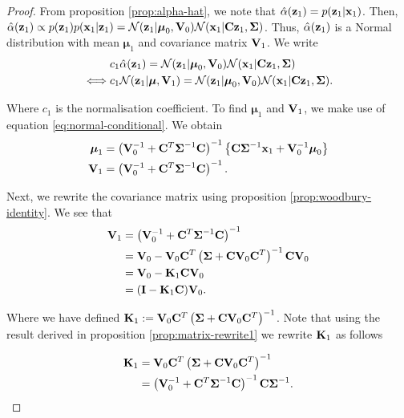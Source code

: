 \documentclass[11pt]{article}
\numberwithin{equation}{section}
\newcommand{\x}{{\bf x}}
\newcommand{\z}{{\bf z}}
\newcommand{\N}{\mathcal{N}}
\begin{document}
\begin{proof}
	From proposition \ref{prop:alpha-hat}, we note that $\hat\alpha(\z_1) = p(\z_1\vert\x_1)$. Then, $\hat\alpha(\z_1) \propto p(\z_1)p(\x_1\vert\z_1) = \N(\z_1 \vert \boldsymbol\mu_0, {\bf V}_0) \N(\x_1\vert {\bf C}\z_1, \boldsymbol\Sigma)$. Thus, $\hat\alpha(\z_1)$ is a Normal distribution with mean $\boldsymbol{\mu}_1$ and covariance matrix ${\bf V}_1$. We write
	\begin{align}
		&c_1 \hat\alpha(\z_1) = \N(\z_1 \vert \boldsymbol\mu_0, {\bf V}_0) \N(\x_1\vert {\bf C}\z_1, \boldsymbol\Sigma)\\
		\iff& c_1 \N(\z_1\vert \boldsymbol\mu, {\bf V}_1) = \N(\z_1 \vert \boldsymbol\mu_0, {\bf V}_0) \N(\x_1\vert {\bf C}\z_1, \boldsymbol\Sigma).
	\end{align}
	
	Where $c_1$ is the normalisation coefficient. To find $\boldsymbol{\mu}_1$ and ${\bf V}_1$, we make use of equation \eqref{eq:normal-conditional}. We  obtain
	\begin{align}
		\boldsymbol{\mu}_1 &= \left({\bf V}_0^{-1} + {\bf C}^T\boldsymbol{\Sigma}^{-1} {\bf C}\right)^{-1} \left\{{\bf C}\boldsymbol\Sigma^{-1}\x_1 + {\bf V}_0^{-1}\boldsymbol\mu_0\right\}\\
		{\bf V}_1 &= \left({\bf V}_0^{-1} + {\bf C}^T\boldsymbol{\Sigma}^{-1} {\bf C}\right)^{-1}.
	\end{align}
	
	Next, we rewrite the covariance matrix using proposition \ref{prop:woodbury-identity}. We see that 
	\begin{align}
		{\bf V}_1 &= \left({\bf V}_0^{-1} + {\bf C}^T\boldsymbol{\Sigma}^{-1} {\bf C}\right)^{-1}\\
		&= {\bf V}_0 - {\bf V}_0 {\bf C}^T\left(\boldsymbol\Sigma + {\bf C}{\bf V}_0{\bf C}^T\right)^{-1}{\bf C}{\bf V}_0 \\
		&= {\bf V}_0 - {\bf K}_1{\bf C}{\bf V}_0\\
		&= ({\bf I} - {\bf K}_1{\bf C}){\bf V}_0. \label{eq:part-v1-rewrite}
	\end{align}
	
	Where we have defined ${\bf K}_1 := {\bf V}_0 {\bf C}^T\left(\boldsymbol\Sigma + {\bf C}{\bf V}_0{\bf C}^T\right)^{-1}$. Note that using the result derived in proposition \ref{prop:matrix-rewrite1} we rewrite ${\bf K}_1$ as follows
	
	\begin{align}
		{\bf K}_1 &= {\bf V}_0 {\bf C}^T\left(\boldsymbol\Sigma + {\bf C}{\bf V}_0{\bf C}^T\right)^{-1}\\
				  &= \left({\bf V}_0^{-1} + {\bf C}^T \boldsymbol\Sigma^{-1}{\bf C}\right)^{-1}{\bf C}\boldsymbol{\Sigma}^{-1}. \label{eq:part-k1-rewrite}
	\end{align}
	

\end{proof}
\end{document}
